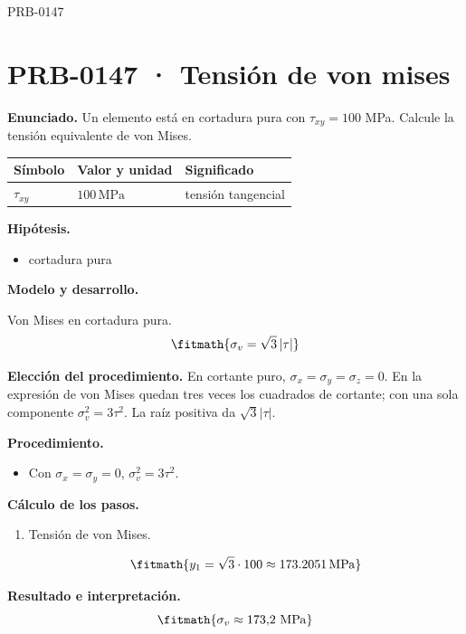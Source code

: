 \Needspace{.3\textheight}

\begin{studiumworked}{PRB-0147}

\section{PRB-0147 · Tensión de von mises}

\textbf{Enunciado.} Un elemento está en cortadura pura con $\tau_{xy} = 100$ MPa. Calcule la tensión equivalente de von Mises.

\par\medskip\noindent\begin{tabular}{@{}p{.18\linewidth}p{.26\linewidth}p{.48\linewidth}@{}}
\toprule Símbolo & Valor y unidad & Significado\\\midrule
$\tau_{xy}$ & $100\,\mathrm{MPa}$ & tensión tangencial\\
\bottomrule\end{tabular}\par\medskip

\textbf{Hipótesis.}\begin{itemize}\item cortadura pura\end{itemize}

\textbf{Modelo y desarrollo.}

Von Mises en cortadura pura.\[\fitmath{\sigma_v = \sqrt{3}\,|\tau|}\]

\textbf{Elección del procedimiento.} En cortante puro, $\sigma_x=\sigma_y=\sigma_z=0$. En la expresión de von Mises quedan tres veces los cuadrados de cortante; con una sola componente $\sigma_v^2=3\tau^2$. La raíz positiva da $\sqrt3|\tau|$.

\textbf{Procedimiento.}\begin{itemize}\item Con $\sigma_x = \sigma_y = 0$, $\sigma_v^2 = 3\tau^2$.\end{itemize}

\textbf{Cálculo de los pasos.}

\begin{enumerate}

\item Tensión de von Mises.

\[\fitmath{y_{1}=\sqrt{3}\cdot 100\approx 173.2051\,\mathrm{MPa}}\]

\end{enumerate}

\textbf{Resultado e interpretación.}\[\fitmath{\sigma_v \approx 173{,}2\ \mathrm{MPa}}\]


\end{studiumworked}
